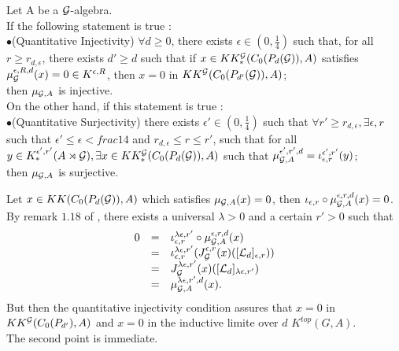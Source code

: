 \begin{prop} 
Let A be a $\mathcal G$-algebra.\\
If the following statement is true :\\

$\bullet$(Quantitative Injectivity) $\forall d\geq 0$, there exists $\epsilon\in (0,\frac{1}{4})$ such that, for all $r\geq r_{d,\epsilon}$, there exists $d'\geq d$ such that if $x\in KK_*^\mathcal G(C_0(P_d(\mathcal G)),A)$ satisfies $\mu_\mathcal G^{\epsilon,R,d}(x)=0\in K^{\epsilon,R}$, then $x=0$ in $KK^\mathcal G(C_0(P_{d'}(\mathcal G)),A)$;\\

then $\mu_{\mathcal G,A}$ is injective.\\

On the other hand, if this statement is true : \\

$\bullet$(Quantitative Surjectivity) there exists $\epsilon'\in (0,\frac{1}{4})$ such that $\forall r'\geq r_{d,\epsilon},\exists \epsilon,r$ such that $\epsilon'\leq \epsilon<frac{1}{4}$ and $r_{d,\epsilon}\leq r\leq r'$, such that for all $y\in K_*^{\epsilon',r'}(A\rtimes\mathcal G),\exists x \in KK_*^\mathcal G(C_0(P_d(\mathcal G)),A)$ such that $\mu_{\mathcal G,A}^{\epsilon',r',d}=\iota_{\epsilon,r}^{\epsilon',r'}(y)$;\\

then $\mu_{\mathcal G,A}$ is surjective.
\end{prop}

\begin{dem}
Let $x\in KK(C_0(P_d(\mathcal G)),A)$ which satisfies $\mu_{\mathcal G,A}(x)=0$, then $\iota_{\epsilon,r}\circ\mu_{\mathcal G,A}^{\epsilon,r,d}(x)=0$. By remark $1.18$ of \cite{OY2}, there exists a universal $\lambda>0$ and a certain $r'>0$ such that
\[\begin{array}{lll}0 &  =  & \iota_{\epsilon,r}^{\lambda\epsilon,r'}\circ \mu_{\mathcal G,A}^{\epsilon,r,d}(x) \\
			& = & \iota_{\epsilon,r}^{\lambda\epsilon,r'} (J_{\mathcal G}^{\epsilon,r}(x)([\mathcal L_d]_{\epsilon,r})) \\
			& = & J_{\mathcal G}^{\lambda\epsilon,r'}(x)([\mathcal L_d]_{\lambda\epsilon,r'}) \\
			& = & \mu_{\mathcal G,A}^{\lambda\epsilon,r',d}(x).
\end{array}\]
But then the quantitative injectivity condition assures that $x=0$ in $KK^\mathcal G(C_0(P_{d'}),A)$ and $x=0$ in the inductive limite over $d$ $K^{top}(G,A)$.\\
The second point is immediate. 
\end{dem}

